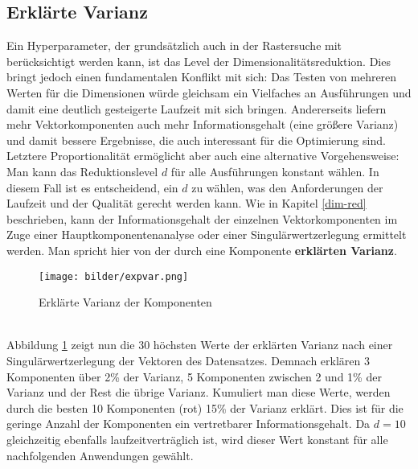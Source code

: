 \subsection{Erklärte Varianz}
Ein Hyperparameter, der grundsätzlich auch in der Rastersuche mit berücksichtigt werden kann, ist das Level der Dimensionalitätsreduktion. Dies bringt jedoch einen fundamentalen Konflikt mit sich: Das Testen von mehreren Werten für die Dimensionen würde gleichsam ein Vielfaches an Ausführungen und damit eine deutlich gesteigerte Laufzeit mit sich bringen. Andererseits liefern mehr Vektorkomponenten auch mehr Informationsgehalt (eine größere Varianz) und damit bessere Ergebnisse, die auch interessant für die Optimierung sind. Letztere Proportionalität ermöglicht aber auch eine alternative Vorgehensweise: Man kann das Reduktionslevel $d$ für alle Ausführungen konstant wählen. In diesem Fall ist es entscheidend, ein $d$ zu wählen, was den Anforderungen der Laufzeit und der Qualität gerecht werden kann. Wie in Kapitel \ref{dim-red} beschrieben, kann der Informationsgehalt der einzelnen Vektorkomponenten im Zuge einer Hauptkomponentenanalyse oder einer Singulärwertzerlegung ermittelt werden. Man spricht hier von der durch eine Komponente \textbf{erklärten Varianz}.
\begin{figure}[htb]
	\begin{center}
		\texttt{[image: bilder/expvar.png]}
		\caption{Erklärte Varianz der Komponenten}\label{expvar}
	\end{center}
\end{figure}\\
Abbildung \ref{expvar} zeigt nun die 30 höchsten Werte der erklärten Varianz nach einer Singulärwertzerlegung der Vektoren des Datensatzes. Demnach erklären 3 Komponenten über 2\% der Varianz, 5 Komponenten zwischen 2 und 1\% der Varianz und der Rest die übrige Varianz. Kumuliert man diese Werte, werden durch die besten 10 Komponenten (rot) 15\% der Varianz erklärt. Dies ist für die geringe Anzahl der Komponenten ein vertretbarer Informationsgehalt. Da $d = 10$ gleichzeitig ebenfalls laufzeitverträglich ist, wird dieser Wert konstant für alle nachfolgenden Anwendungen gewählt.

